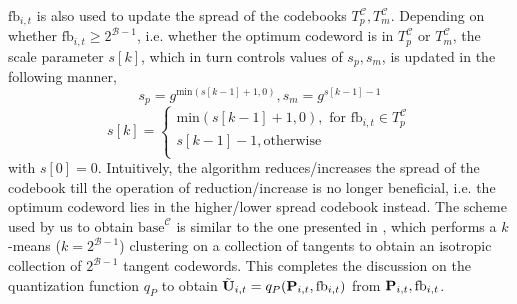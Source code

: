 \documentclass[conference]{IEEEtran}
\begin{document}
$\text{fb}_{i,t}$ is also used to update the spread of the codebooks $T^{\mathcal{C}}_p,T^{\mathcal{C}}_m$.
Depending on whether $\text{fb}_{i,t} \geq 2^{\mathcal{B}-1}$,
i.e. whether the optimum codeword is in $T^{\mathcal{C}}_p$ or
$T^{\mathcal{C}}_m$, the scale parameter $s[k]$, which in turn
controls values of $s_p, s_m$, is updated in the following manner,
$$s_p=g^{\text{min}(s[k-1]+1,0)}, s_m = g^{s[k-1]-1}$$
$$
s[k]=
\begin{cases}
\text{min}(s[k-1]+1,0), \text{ for } \text{fb}_{i,t} \in T^{\mathcal{C}}_p\\
s[k-1]-1, \text{otherwise}\\
\end{cases}
$$
with $s[0]=0$.
Intuitively, the algorithm reduces/increases the spread of the codebook till the operation of reduction/increase is no longer beneficial, i.e. the optimum codeword lies in the higher/lower spread codebook instead.
The scheme used by us to obtain $\text{base}^{\mathcal{C}}$ is similar to the one presented in \cite{Gupt1905:Predictive}, which performs a $k$-means ($k=2^{\mathcal{B}-1}$) clustering on a collection of tangents to obtain an isotropic collection of $2^{\mathcal{B}-1}$ tangent codewords.
This completes the discussion on the quantization function $q_P$ to obtain $\tilde{{\bf U}}_{i,t}=q_P({\bf P}_{i,t},\text{fb}_{i,t})$ from ${\bf P}_{i,t},\text{fb}_{i,t}$.
\end{document}
